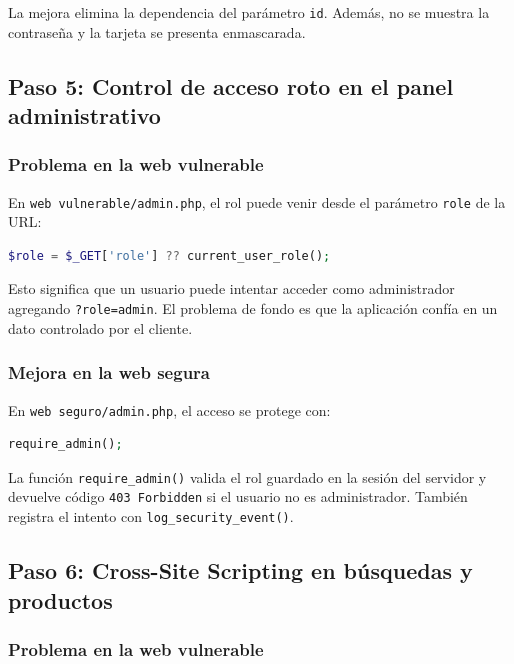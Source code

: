 \documentclass[12pt,a4paper]{article}
\begin{document}
La mejora elimina la dependencia del parámetro \texttt{id}. Además, no se muestra la contraseña y la tarjeta se presenta enmascarada.

\subsection{Paso 5: Control de acceso roto en el panel administrativo}

\subsubsection*{Problema en la web vulnerable}

En \texttt{web vulnerable/admin.php}, el rol puede venir desde el parámetro \texttt{role} de la URL:

\begin{lstlisting}[language=PHP]
$role = $_GET['role'] ?? current_user_role();
\end{lstlisting}

Esto significa que un usuario puede intentar acceder como administrador agregando \texttt{?role=admin}. El problema de fondo es que la aplicación confía en un dato controlado por el cliente.

\subsubsection*{Mejora en la web segura}

En \texttt{web seguro/admin.php}, el acceso se protege con:

\begin{lstlisting}[language=PHP]
require_admin();
\end{lstlisting}

La función \texttt{require\_admin()} valida el rol guardado en la sesión del servidor y devuelve código \texttt{403 Forbidden} si el usuario no es administrador. También registra el intento con \texttt{log\_security\_event()}.

\subsection{Paso 6: Cross-Site Scripting en búsquedas y productos}

\subsubsection*{Problema en la web vulnerable}
\end{document}

